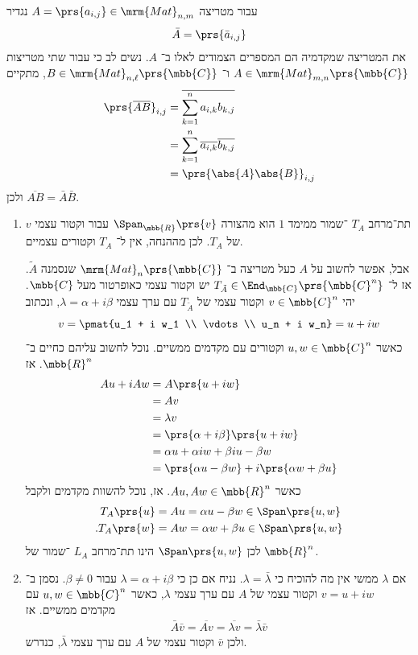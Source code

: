 \documentclass[a4paper,10pt,twoside,openany]{book}
\begin{document}
\begin{solution}
עבור מטריצה
$A = \prs{a_{i,j}} \in \mrm{Mat}_{n, m}$
נגדיר
\[\bar{A} = \prs{\bar{a}_{i,j}}\]
את המטריצה שמקדמיה הם המספרים הצמודים לאלו ב־%
$A$.
נשים לב כי עבור שתי מטריצות
$A \in \mrm{Mat}_{m,n}\prs{\mbb{C}}$
ו־%
$B \in \mrm{Mat}_{n,\ell}\prs{\mbb{C}}$,
מתקיים
\begin{align*}
\prs{\overline{AB}}_{i,j} &= \overline{\sum_{k = 1}^n a_{i,k} b_{k,j}}
\\&= \sum_{k=1}^n \overline{a_{i,k}} \overline{b_{k,j}}
\\&= \prs{\abs{A} \abs{B}}_{i,j}
\end{align*}
ולכן
$\overline{AB} = \bar{A} \bar{B}$.

\begin{enumerate}
\item
תת־מרחב
$T_A$%
־שמור ממימד
$1$
הוא מהצורה
$\Span_{\mbb{R}}\prs{v}$
עבור וקטור עצמי
$v$
של
$T_A$.
לכן מההנחה, אין ל־%
$T_A$
וקטורים עצמיים.

אבל, אפשר לחשוב על
$A$
כעל מטריצה ב־%
$\mrm{Mat}_n\prs{\mbb{C}}$
שנסמנה
$\tilde{A}$.
אז ל־%
$T_{\tilde{A}} \in \End_{\mbb{C}}\prs{\mbb{C}^n}$
יש וקטור עצמי כאופרטור מעל
$\mbb{C}$.
יהי
$v \in \mbb{C}^n$
וקטור עצמי של
$T_{\tilde{A}}$
עם ערך עצמי
$\lambda = \alpha + i \beta$,
ונכתוב
\[v = \pmat{u_1 + i w_1 \\ \vdots \\ u_n + i w_n} = u + iw\]
כאשר
$u,w \in \mbb{C}^n$
וקטורים עם מקדמים ממשיים. נוכל לחשוב עליהם כחיים ב־%
$\mbb{R}^n$.
אז
\begin{align*}
Au + iAw &= A\prs{u + iw}
\\&= Av
\\&= \lambda v
\\&= \prs{\alpha + i \beta} \prs{u + iw}
\\&= \alpha u + \alpha i w + \beta i u - \beta w
\\&= \prs{\alpha u - \beta w} + i\prs{\alpha w + \beta u}
\end{align*}
כאשר
$Au, Aw \in \mbb{R}^n$.
אז, נוכל להשוות מקדמים ולקבל
\begin{align*}
T_A\prs{u} &= Au = \alpha u - \beta w \in \Span\prs{u,w} \\
\text{.} T_A\prs{w} &= Aw =  \alpha w + \beta u \in \Span\prs{u,w}
\end{align*}
לכן
$\Span\prs{u,w}$
הינו תת־מרחב
$L_A$%
־שמור של
$\mbb{R}^n$.

\item אם
$\lambda$
ממשי אין מה להוכיח כי
$\lambda = \bar{\lambda}$.
נניח אם כן כי
$\lambda = \alpha + i\beta$
עבור
$\beta \neq 0$.
נסמן ב־%
$v = u + iw$
וקטור עצמי של
$A$
עם ערך עצמי
$\lambda$,
כאשר
$u,w \in \mbb{C}^n$
עם מקדמים ממשיים.
אז
\begin{align*}
\bar{A}\bar{v} = \overline{Av} = \overline{\lambda v} = \bar{\lambda} \bar{v}
\end{align*}
ולכן
$\bar{v}$
וקטור עצמי של
$A$
עם ערך עצמי
$\bar{\lambda}$,
כנדרש.
\end{enumerate}
\end{solution}
\end{document}
